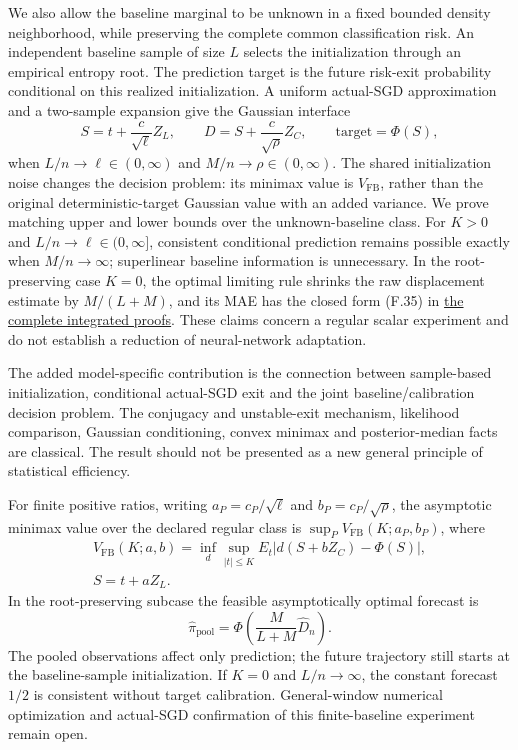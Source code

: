 We also allow the baseline marginal to be unknown in a fixed bounded
density neighborhood, while preserving the complete common
classification risk. An independent baseline sample of size \(L\)
selects the initialization through an empirical entropy root. The
prediction target is the future risk-exit probability conditional on
this realized initialization. A uniform actual-SGD approximation and a
two-sample expansion give the Gaussian interface \[
S=t+\frac{c}{\sqrt\ell}Z_L,\qquad
D=S+\frac{c}{\sqrt\rho}Z_C,\qquad
\text{target}=\Phi(S),
\] when \(L/n\to\ell\in(0,\infty)\) and \(M/n\to\rho\in(0,\infty)\). The
shared initialization noise changes the decision problem: its minimax
value is \(V_{\mathrm{FB}}\), rather than the original
deterministic-target Gaussian value with an added variance. We prove
matching upper and lower bounds over the unknown-baseline class. For
\(K>0\) and \(L/n\to\ell\in(0,\infty]\), consistent conditional
prediction remains possible exactly when \(M/n\to\infty\); superlinear
baseline information is unnecessary. In the root-preserving case
\(K=0\), the optimal limiting rule shrinks the raw displacement estimate
by \(M/(L+M)\), and its MAE has the closed form (F.35) in
\href{unknown_direction.md\#6-finite-baseline-information-and-conditional-prediction}{the
complete integrated proofs}. These claims concern a regular scalar
experiment and do not establish a reduction of neural-network
adaptation.

The added model-specific contribution is the connection between
sample-based initialization, conditional actual-SGD exit and the joint
baseline/calibration decision problem. The conjugacy and unstable-exit
mechanism, likelihood comparison, Gaussian conditioning, convex minimax
and posterior-median facts are classical. The result should not be
presented as a new general principle of statistical efficiency.

For finite positive ratios, writing \(a_P=c_P/\sqrt{\ell}\) and
\(b_P=c_P/\sqrt{\rho}\), the asymptotic minimax value over the declared
regular class is \(\sup_P V_{\mathrm{FB}}(K;a_P,b_P)\), where \[
\begin{gathered}V_{\mathrm{FB}}(K;a,b)=\inf_d\sup_{|t|\le K}E_t|d(S+bZ_C)-\Phi(S)|,\\ S=t+aZ_L.\end{gathered}
\] In the root-preserving subcase the feasible asymptotically optimal
forecast is \[
\widehat\pi_{\mathrm{pool}}=\Phi\!\left(\frac{M}{L+M}\widehat D_n\right).
\] The pooled observations affect only prediction; the future trajectory
still starts at the baseline-sample initialization. If \(K=0\) and
\(L/n\to\infty\), the constant forecast \(1/2\) is consistent without
target calibration. General-window numerical optimization and actual-SGD
confirmation of this finite-baseline experiment remain open.

